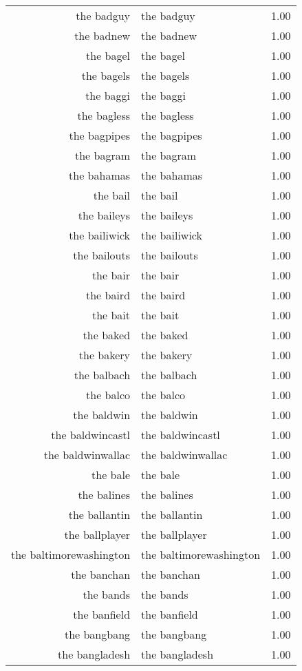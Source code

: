\begin{table}[ht]
\begin{tabular}{rlr}
  the badguy & the badguy & 1.00 \\ 
  the badnew & the badnew & 1.00 \\ 
  the bagel & the bagel & 1.00 \\ 
  the bagels & the bagels & 1.00 \\ 
  the baggi & the baggi & 1.00 \\ 
  the bagless & the bagless & 1.00 \\ 
  the bagpipes & the bagpipes & 1.00 \\ 
  the bagram & the bagram & 1.00 \\ 
  the bahamas & the bahamas & 1.00 \\ 
  the bail & the bail & 1.00 \\ 
  the baileys & the baileys & 1.00 \\ 
  the bailiwick & the bailiwick & 1.00 \\ 
  the bailouts & the bailouts & 1.00 \\ 
  the bair & the bair & 1.00 \\ 
  the baird & the baird & 1.00 \\ 
  the bait & the bait & 1.00 \\ 
  the baked & the baked & 1.00 \\ 
  the bakery & the bakery & 1.00 \\ 
  the balbach & the balbach & 1.00 \\ 
  the balco & the balco & 1.00 \\ 
  the baldwin & the baldwin & 1.00 \\ 
  the baldwincastl & the baldwincastl & 1.00 \\ 
  the baldwinwallac & the baldwinwallac & 1.00 \\ 
  the bale & the bale & 1.00 \\ 
  the balines & the balines & 1.00 \\ 
  the ballantin & the ballantin & 1.00 \\ 
  the ballplayer & the ballplayer & 1.00 \\ 
  the baltimorewashington & the baltimorewashington & 1.00 \\ 
  the banchan & the banchan & 1.00 \\ 
  the bands & the bands & 1.00 \\ 
  the banfield & the banfield & 1.00 \\ 
  the bangbang & the bangbang & 1.00 \\ 
  the bangladesh & the bangladesh & 1.00 \\ 

\end{tabular}
\end{table}
